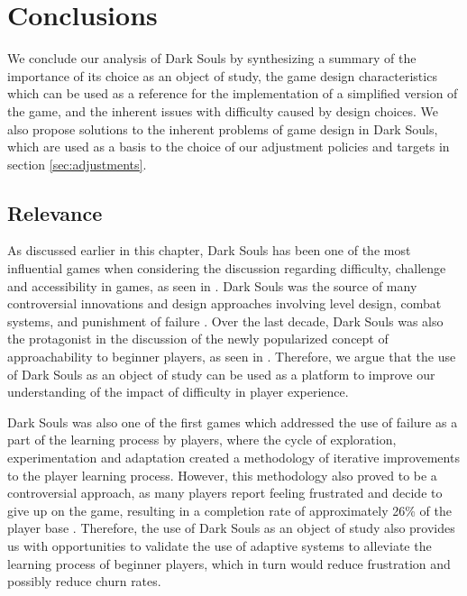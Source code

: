 \section{Conclusions}

We conclude our analysis of Dark Souls by synthesizing a summary of the importance of its choice as an object of study, the game design characteristics which can be used as a reference for the implementation of a simplified version of the game, and the inherent issues with difficulty caused by design choices. We also propose solutions to the inherent problems of game design in Dark Souls, which are used as a basis to the choice of our adjustment policies and targets in section \ref{sec:adjustments}.

\subsection{Relevance}

As discussed earlier in this chapter, Dark Souls has been one of the most influential games when considering the discussion regarding difficulty, challenge and accessibility in games, as seen in \cite{ONLINE_GettingWrongDarkSouls}. Dark Souls was the source of many controversial innovations and design approaches involving level design, combat systems, and punishment of failure \cite{ONLINE_ToughLoveDarkSoulsDifficulty}. Over the last decade, Dark Souls was also the protagonist in the discussion of the newly popularized concept of approachability to beginner players, as seen in \cite{ONLINE_ApproachabilityFixDarkSouls}. Therefore, we argue that the use of Dark Souls as an object of study can be used as a platform to improve our understanding of the impact of difficulty in player experience.

Dark Souls was also one of the first games which addressed the use of failure as a part of the learning process by players, where the cycle of exploration, experimentation and adaptation created a methodology of iterative improvements to the player learning process. However, this methodology also proved to be a controversial approach, as many players report feeling frustrated and decide to give up on the game, resulting in a completion rate of approximately 26\% of the player base \cite{ONLINE_ApproachabilityFixDarkSouls}. Therefore, the use of Dark Souls as an object of study also provides us with opportunities to validate the use of adaptive systems to alleviate the learning process of beginner players, which in turn would reduce frustration and possibly reduce churn rates.

